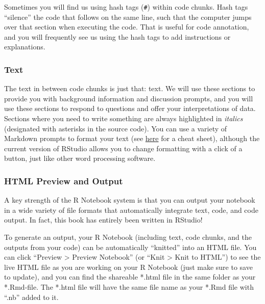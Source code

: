 \documentclass[
]{book}
\begin{document}
Sometimes you will find us using hash tags (\texttt{\#}) within code chunks. Hash tags ``silence'' the code that follows on the same line, such that the computer jumps over that section when executing the code. That is useful for code annotation, and you will frequently see us using the hash tags to add instructions or explanations.

\hypertarget{text}{%
\subsubsection*{Text}\label{text}}

The text in between code chunks is just that: text. We will use these sections to provide you with background information and discussion prompts, and you will use these sections to respond to questions and offer your interpretations of data. Sections where you need to write something are always highlighted in \emph{italics} (designated with asterisks in the source code). You can use a variety of Markdown prompts to format your text (see \href{https://rstudio.com/wp-content/uploads/2015/02/rmarkdown-cheatsheet.pdf}{here} for a cheat sheet), although the current version of RStudio allows you to change formatting with a click of a button, just like other word processing software.

\hypertarget{html-preview-and-output}{%
\subsubsection*{HTML Preview and Output}\label{html-preview-and-output}}

A key strength of the R Notebook system is that you can output your notebook in a wide variety of file formats that automatically integrate text, code, and code output. In fact, this book has entirely been written in RStudio!

To generate an output, your R Notebook (including text, code chunks, and the outputs from your code) can be automatically ``knitted'' into an HTML file. You can click ``Preview \textgreater{} Preview Notebook'' (or ``Knit \textgreater{} Knit to HTML'') to see the live HTML file as you are working on your R Notebook (just make sure to save to update), and you can find the shareable *.html file in the same folder as your *.Rmd-file. The *.html file will have the same file name as your *.Rmd file with ``.nb'' added to it.
\end{document}
